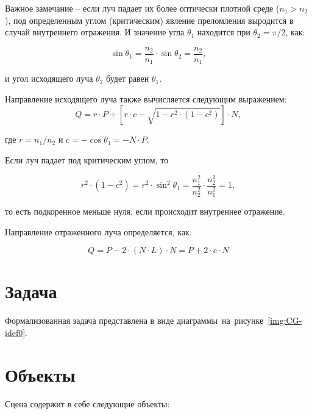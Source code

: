Важное замечание -- если луч падает их более оптически плотной среде ($n_1 > n_2$), под определенным углом (критическим) явление преломления выродится в случай внутреннего отражения. И значение угла $\theta_1$ находится при $\theta_2 = \pi / 2$, как:

\begin{equation}
	\sin\theta_1 = \frac{n_2}{n_1} \cdot \sin\theta_2 = \frac{n_2}{n_1},
\end{equation}

и угол исходящего луча $\theta_2$ будет равен $\theta_1$.

Направление исходящего луча также вычисляется следующим выражением:
\begin{equation}
	 Q =r \cdot P + \left[r \cdot c- {\sqrt {1-r^{2} \cdot (1-c^{2})}}\right] \cdot N,
\end{equation}

где $r=n_{1}/n_{2}$ и $c = -\cos\theta_1 = -N \cdot P$.

Если луч падает под критическим углом, то

\begin{equation}
	r^2 \cdot (1 - c^2) = r^2 \cdot \sin^2 \theta_1 = \frac{n_1^2}{n_2^2} \cdot \frac{n_2^2}{n_1^2} = 1, 
\end{equation}

то есть подкоренное меньше нуля, если происходит внутреннее отражение.

Направление отраженного луча определяется, как:

\begin{equation}
	Q = P - 2 \cdot (N \cdot L) \cdot N = P + 2 \cdot c \cdot N
\end{equation}

\section{Задача}

Формализованная задача представлена в виде диаграммы~на~рисунке~\ref{img:CG-idef0}.\newline



\section{Объекты}

Сцена содержит в себе следующие объекты:

